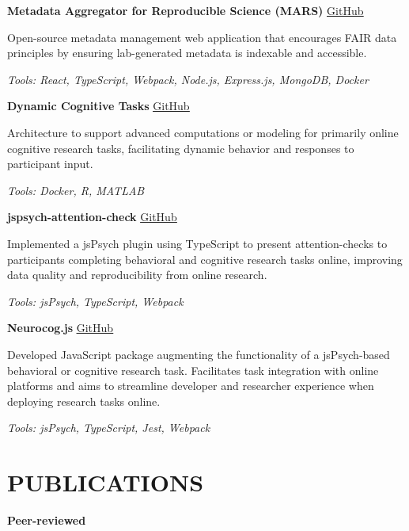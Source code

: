 \documentclass{article}
\begin{document}
  \textbf{Metadata Aggregator for Reproducible Science (MARS)} \hfill \href{https://github.com/Brain-Development-and-Disorders-Lab/mars}{\color{blue}\underline{GitHub}}

  Open-source metadata management web application that encourages FAIR data principles by ensuring lab-generated metadata is indexable and accessible.

  \textit{Tools: React, TypeScript, Webpack, Node.js, Express.js, MongoDB, Docker}

  \medbreak

  \textbf{Dynamic Cognitive Tasks} \hfill \href{https://github.com/Brain-Development-and-Disorders-Lab/mars}{\color{blue}\underline{GitHub}}

  Architecture to support advanced computations or modeling for primarily online cognitive research tasks, facilitating dynamic behavior and responses to participant input.

  \textit{Tools: Docker, R, MATLAB}

  \medbreak

  \textbf{jspsych-attention-check} \hfill \href{https://github.com/Brain-Development-and-Disorders-Lab/jspsych-attention-check}{\color{blue}\underline{GitHub}}

  Implemented a jsPsych plugin using TypeScript to present attention-checks to participants completing behavioral and cognitive research tasks online, improving data quality and reproducibility from online research.

  \textit{Tools: jsPsych, TypeScript, Webpack}

  \medbreak

  \textbf{Neurocog.js} \hfill \href{https://github.com/Brain-Development-and-Disorders-Lab/Neurocog.js}{\color{blue}\underline{GitHub}}

  Developed JavaScript package augmenting the functionality of a jsPsych-based behavioral or cognitive research task. Facilitates task integration with online platforms and aims to streamline developer and researcher experience when deploying research tasks online.

  \textit{Tools: jsPsych, TypeScript, Jest, Webpack}

  \section*{\centering\uppercase{Publications}}

  {\large\textbf{Peer-reviewed}}
\end{document}
